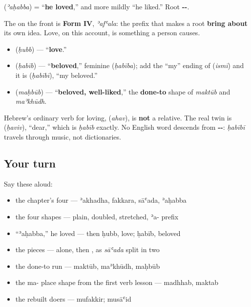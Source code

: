 \begin{cousinweb}
\textbf{} (\emph{ʾaḥabba}) = \textquotedblleft{}\textbf{he loved},\textquotedblright{} and more mildly \textquotedblleft{}he liked.\textquotedblright{} Root \textbf{--}.

The \textbf{} on the front is \textbf{Form IV}, \emph{ʾafʿala}: the prefix that makes a root \textbf{bring about} its own idea. Love, on this account, is something a person causes.

\begin{itemize}
\raggedright
  \item \textbf{} (\emph{ḥubb}) — \textquotedblleft{}\textbf{love}.\textquotedblright{}
  \item \textbf{} (\emph{ḥabīb}) — \textquotedblleft{}\textbf{beloved},\textquotedblright{} feminine \textbf{} (\emph{ḥabība}); add the \textquotedblleft{}my\textquotedblright{} ending of \textbf{} (\emph{ismī}) and it is \textbf{} (\emph{ḥabībī}), \textquotedblleft{}my beloved.\textquotedblright{}
  \item \textbf{} (\emph{maḥbūb}) — \textquotedblleft{}\textbf{beloved, well-liked},\textquotedblright{} the \textbf{done-to} shape of \emph{maktūb} and \emph{maʾkhūdh}.
\end{itemize}

Hebrew's ordinary verb for loving, \textbf{} (\emph{ahav}), is \textbf{not} a relative. The real twin is \textbf{} (\emph{ḥaviv}), \textquotedblleft{}dear,\textquotedblright{} which is \emph{ḥabīb} exactly. No English word descends from \textbf{--}: \emph{ḥabībī} travels through music, not dictionaries.
\end{cousinweb}

\subsection*{Your turn}
Say these aloud:

\begin{itemize}
\raggedright
  \item the chapter's four — ʾakhadha, fakkara, sāʿada, ʾaḥabba
  \item the four shapes — plain, doubled, stretched, ʾa- prefix
  \item \textquotedblleft{}ʾaḥabba,\textquotedblright{} he loved — then ḥubb, love; ḥabīb, beloved
  \item the pieces —  alone, then , as \emph{sāʿada} split in two
  \item the done-to run — maktūb, maʾkhūdh, maḥbūb
  \item the ma- place shape from the first verb lesson — madhhab, maktab
  \item the rebuilt doers — mufakkir; musāʿid
\end{itemize}

